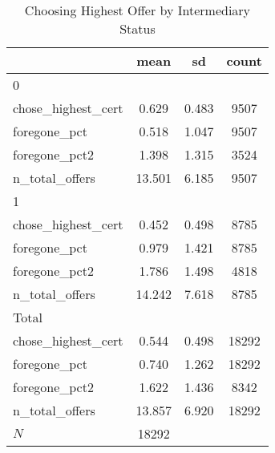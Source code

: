 \begin{table}[htbp]\centering
\def\sym#1{\ifmmode^{#1}\else\(^{#1}\)\fi}
\caption{Choosing Highest Offer by Intermediary Status}
\begin{tabular}{l*{1}{ccc}}
\hline\hline
            &        mean&          sd&       count\\
\hline
0           &            &            &            \\
chose\_highest\_cert&       0.629&       0.483&        9507\\
foregone\_pct&       0.518&       1.047&        9507\\
foregone\_pct2&       1.398&       1.315&        3524\\
n\_total\_offers&      13.501&       6.185&        9507\\
\hline
1           &            &            &            \\
chose\_highest\_cert&       0.452&       0.498&        8785\\
foregone\_pct&       0.979&       1.421&        8785\\
foregone\_pct2&       1.786&       1.498&        4818\\
n\_total\_offers&      14.242&       7.618&        8785\\
\hline
Total       &            &            &            \\
chose\_highest\_cert&       0.544&       0.498&       18292\\
foregone\_pct&       0.740&       1.262&       18292\\
foregone\_pct2&       1.622&       1.436&        8342\\
n\_total\_offers&      13.857&       6.920&       18292\\
\hline
\(N\)       &       18292&            &            \\
\hline\hline
\end{tabular}
\end{table}
